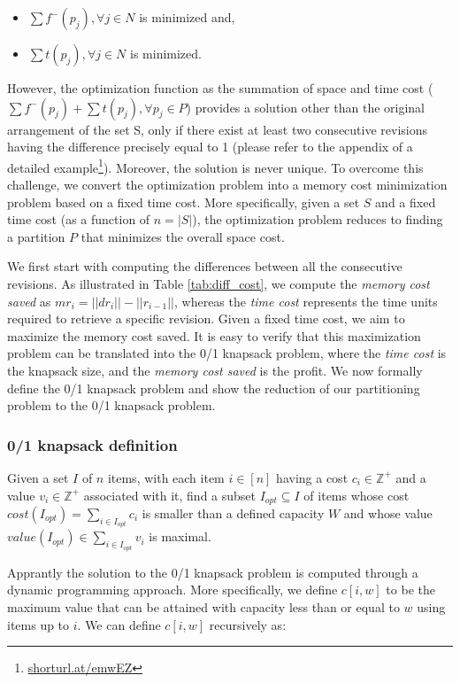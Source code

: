 \documentclass[acmsmall]{acmart}
\begin{document}
\begin{itemize}
	\item $\sum f^-(p_j), \forall j \in N$ is minimized and,
	\item $\sum t(p_j), \forall j \in N$ is minimized.
\end{itemize}


However, the optimization function as the summation of space and time cost ($\sum f^-(p_j) + \sum t(p_j), \forall p_j \in P$) provides a solution other than the original arrangement of the set S, only if there exist at least two consecutive revisions having the difference precisely equal to 1 (please refer to the appendix of a detailed example\footnote{\url{shorturl.at/emwEZ}}). Moreover, the solution is never unique. To overcome this challenge, we convert the optimization problem into a memory cost minimization problem based on a fixed time cost. More specifically, given a set $S$ and a fixed time cost (as a function of $n = |S|$), the optimization problem reduces to finding a partition $P$ that minimizes the overall space cost.

We first start with computing the differences between all the consecutive revisions. As illustrated in Table \ref{tab:diff_cost}, we compute the \emph{memory cost saved}  as $mr_i = ||dr_i|| - ||r_{i-1}||$, whereas the \emph{time cost} represents the time units required to retrieve a specific revision. Given a fixed time cost, we aim to maximize the memory cost saved. It is easy to verify that this maximization problem can be translated into the 0/1 knapsack problem, where the \emph{time cost} is the knapsack size, and the \emph{memory cost saved} is the profit. We now formally define the 0/1 knapsack problem and show the reduction of our partitioning problem to the 0/1 knapsack problem.


\subsubsection{0/1 knapsack definition}
Given a set $I$ of $n$ items, with each item $i \in [n]$ having a cost $c_i \in \mathbb{Z^+}$ and a value $v_i \in \mathbb{Z^+}$ associated with it, find a subset $I_{opt} \subseteq I$ of items whose cost $cost(I_{opt}) = \sum_{i \in I_{opt}} c_i$ is smaller than a defined capacity $W$ and whose value $value(I_{opt}) \in \sum_{i \in I_{opt}} v_i$ is maximal.   

Apprantly the solution to the 0/1 knapsack problem is computed through a dynamic programming approach. More specifically, we define $c[i,w]$ to be the maximum value that can be attained with capacity less than or equal to $w$ using items up to $i$. We can define $c[i,w]$ recursively as:
\end{document}
